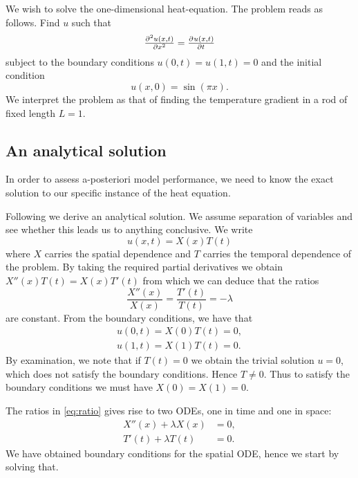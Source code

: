 \documentclass[article, a4paper, oneside]{memoir}
\begin{document}
	We wish to solve the one-dimensional heat-equation. The problem reads
	as follows. Find \( u \) such that
	\begin{equation}
		\label{eq:heat_eq}
		\pd[2]{u(x, t)}{x} = \pd{u(x, t)}{t}
	\end{equation}
	subject to the boundary conditions \( u(0, t) = u(1, t) = 0 \) and the
	initial condition
	\begin{equation}
		u(x, 0) = \sin(\pi x).
	\end{equation}
	We interpret the problem as that of finding the temperature gradient in
	a rod of fixed length \( L = 1\).

	\subsection{An analytical solution}
	
	In order to assess a-posteriori model performance, we need to know the
	exact solution to our specific instance of the heat equation.

	Following \cite{hancockLinearPartialDifferential} we derive an
	analytical solution.  We assume separation of variables and see whether
	this leads us to anything conclusive. We write
	\begin{equation}
		u(x, t) = X(x)T(t)
	\end{equation}
	where \( X \) carries the spatial dependence and \( T \) carries the
	temporal dependence of the problem.  By taking the required partial
	derivatives we obtain \(X''(x)T(t) = X(x)T'(t)\) from which we can
	deduce that the ratios
	\begin{equation}
		\label{eq:ratio}
		\frac{X''(x)}{X(x)} = \frac{T'(t)}{T(t)} = -\lambda
	\end{equation}
	are constant. From the boundary conditions, we have that
	\begin{align}
		u(0, t) = X(0)T(t) = 0, \\
		u(1, t) = X(1)T(t) = 0.
	\end{align}
	By examination, we note that if \(T(t) = 0\) we obtain the trivial
	solution \( u = 0\), which does not satisfy the boundary conditions.
	Hence \( T \neq 0 \). Thus to satisfy the boundary conditions we must
	have \( X(0) = X(1) = 0 \).
	
	The ratios in \cref{eq:ratio} gives rise to two ODEs, one in time and
	one in space:
	\begin{align}
		X''(x) + \lambda X(x) &= 0, \label{eq:spatialODE} \\
		T'(t) + \lambda T(t) &= 0 \label{eq:temp_ODE}.
	\end{align}
	We have obtained boundary conditions for the spatial ODE, hence we
	start by solving that.
	
\end{document}
